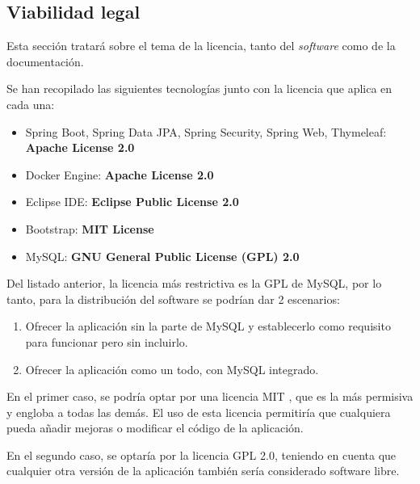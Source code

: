 \clearpage
\subsection{Viabilidad legal}

Esta sección tratará sobre el tema de la licencia, tanto del \textit{software} como de la documentación.

Se han recopilado las siguientes tecnologías junto con la licencia que aplica en cada una:

\begin{itemize}
	\item Spring Boot, Spring Data JPA, Spring Security, Spring Web, Thymeleaf: \textbf{Apache License 2.0}
	\item Docker Engine: \textbf{Apache License 2.0}
	\item Eclipse IDE:  \textbf{Eclipse Public License 2.0}
	\item Bootstrap:  \textbf{MIT License}
	\item MySQL:  \textbf{GNU General Public License (GPL) 2.0}
\end{itemize}

Del listado anterior, la licencia más restrictiva es la GPL de MySQL, por lo tanto, para la distribución del software se podrían dar 2 escenarios:

\begin{enumerate}
	\item Ofrecer la aplicación sin la parte de MySQL y establecerlo como requisito para funcionar pero sin incluirlo.
	\item Ofrecer la aplicación como un todo, con MySQL integrado.
\end{enumerate}

En el primer caso, se podría optar por una licencia MIT , que es la más permisiva y engloba a todas las demás. 
El uso de esta licencia permitiría que cualquiera pueda añadir mejoras o modificar el código de la aplicación.

En el segundo caso, se optaría por la licencia GPL 2.0, teniendo en cuenta que cualquier otra versión de la aplicación también sería considerado software libre.

